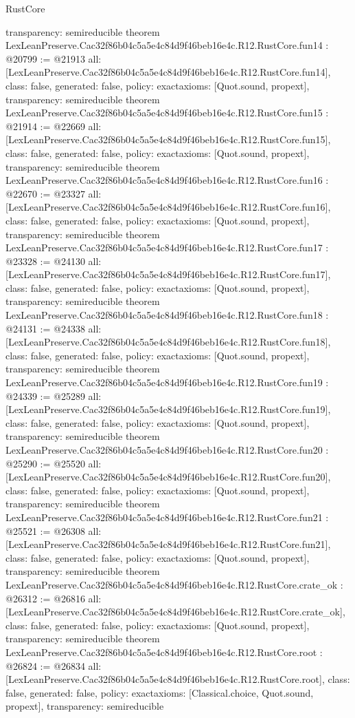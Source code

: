 \begin{lexlean}{RustCore}
\begin{coremodule}
{  transparency: semireducible
}
theorem LexLeanPreserve.Cac32f86b04c5a5e4c84d9f46beb16e4c.R12.RustCore.fun14 : @20799 := @21913 {
  all: [LexLeanPreserve.Cac32f86b04c5a5e4c84d9f46beb16e4c.R12.RustCore.fun14],
  class: false,
  generated: false,
  policy: exact{axioms: [Quot.sound, propext]},
  transparency: semireducible
}
theorem LexLeanPreserve.Cac32f86b04c5a5e4c84d9f46beb16e4c.R12.RustCore.fun15 : @21914 := @22669 {
  all: [LexLeanPreserve.Cac32f86b04c5a5e4c84d9f46beb16e4c.R12.RustCore.fun15],
  class: false,
  generated: false,
  policy: exact{axioms: [Quot.sound, propext]},
  transparency: semireducible
}
theorem LexLeanPreserve.Cac32f86b04c5a5e4c84d9f46beb16e4c.R12.RustCore.fun16 : @22670 := @23327 {
  all: [LexLeanPreserve.Cac32f86b04c5a5e4c84d9f46beb16e4c.R12.RustCore.fun16],
  class: false,
  generated: false,
  policy: exact{axioms: [Quot.sound, propext]},
  transparency: semireducible
}
theorem LexLeanPreserve.Cac32f86b04c5a5e4c84d9f46beb16e4c.R12.RustCore.fun17 : @23328 := @24130 {
  all: [LexLeanPreserve.Cac32f86b04c5a5e4c84d9f46beb16e4c.R12.RustCore.fun17],
  class: false,
  generated: false,
  policy: exact{axioms: [Quot.sound, propext]},
  transparency: semireducible
}
theorem LexLeanPreserve.Cac32f86b04c5a5e4c84d9f46beb16e4c.R12.RustCore.fun18 : @24131 := @24338 {
  all: [LexLeanPreserve.Cac32f86b04c5a5e4c84d9f46beb16e4c.R12.RustCore.fun18],
  class: false,
  generated: false,
  policy: exact{axioms: [Quot.sound, propext]},
  transparency: semireducible
}
theorem LexLeanPreserve.Cac32f86b04c5a5e4c84d9f46beb16e4c.R12.RustCore.fun19 : @24339 := @25289 {
  all: [LexLeanPreserve.Cac32f86b04c5a5e4c84d9f46beb16e4c.R12.RustCore.fun19],
  class: false,
  generated: false,
  policy: exact{axioms: [Quot.sound, propext]},
  transparency: semireducible
}
theorem LexLeanPreserve.Cac32f86b04c5a5e4c84d9f46beb16e4c.R12.RustCore.fun20 : @25290 := @25520 {
  all: [LexLeanPreserve.Cac32f86b04c5a5e4c84d9f46beb16e4c.R12.RustCore.fun20],
  class: false,
  generated: false,
  policy: exact{axioms: [Quot.sound, propext]},
  transparency: semireducible
}
theorem LexLeanPreserve.Cac32f86b04c5a5e4c84d9f46beb16e4c.R12.RustCore.fun21 : @25521 := @26308 {
  all: [LexLeanPreserve.Cac32f86b04c5a5e4c84d9f46beb16e4c.R12.RustCore.fun21],
  class: false,
  generated: false,
  policy: exact{axioms: [Quot.sound, propext]},
  transparency: semireducible
}
theorem LexLeanPreserve.Cac32f86b04c5a5e4c84d9f46beb16e4c.R12.RustCore.crate_ok : @26312 := @26816 {
  all: [LexLeanPreserve.Cac32f86b04c5a5e4c84d9f46beb16e4c.R12.RustCore.crate_ok],
  class: false,
  generated: false,
  policy: exact{axioms: [Quot.sound, propext]},
  transparency: semireducible
}
theorem LexLeanPreserve.Cac32f86b04c5a5e4c84d9f46beb16e4c.R12.RustCore.root : @26824 := @26834 {
  all: [LexLeanPreserve.Cac32f86b04c5a5e4c84d9f46beb16e4c.R12.RustCore.root],
  class: false,
  generated: false,
  policy: exact{axioms: [Classical.choice, Quot.sound, propext]},
  transparency: semireducible
}


\end{coremodule}
\end{lexlean}
